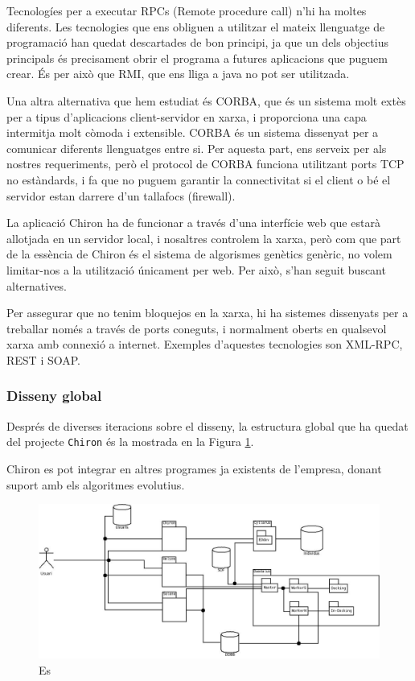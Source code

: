 Tecnologíes per a executar RPCs (Remote procedure call) n'hi ha moltes
diferents. Les tecnologies que ens obliguen a utilitzar el mateix llenguatge de
programació han quedat descartades de bon principi, ja que un dels objectius
principals és precisament obrir el programa a futures aplicacions que puguem
crear.  És per això que RMI, que ens lliga a java no pot ser utilitzada.  

Una altra alternativa que hem estudiat és CORBA, que és un sistema molt extès
per a tipus d'aplicacions client-servidor en xarxa, i proporciona una capa
intermitja molt còmoda i extensible.  CORBA és un sistema dissenyat per a
comunicar diferents llenguatges entre si.  Per aquesta part, ens serveix per als
nostres requeriments, però el protocol de CORBA funciona utilitzant ports TCP
no estàndards, i fa que no puguem garantir la connectivitat si el client o bé el
servidor estan darrere d'un tallafocs (firewall).

La aplicació Chiron ha de funcionar a través d'una interfície web que estarà
allotjada en un servidor local, i nosaltres controlem la xarxa, però com que
part de la essència de Chiron és el sistema de algorismes genètics genèric, no
volem limitar-nos a la utilització únicament per web.  Per això, s'han seguit
buscant alternatives.

Per assegurar que no tenim bloquejos en la xarxa, hi ha sistemes dissenyats per a
treballar només a través de ports coneguts, i normalment oberts en qualsevol
xarxa amb connexió a internet.  Exemples d'aquestes tecnologies son XML-RPC, REST
i SOAP.

\subsubsection{Disseny global} %
\label{ssub:Diseny global}

Després de diverses iteracions sobre el disseny, la estructura global que ha
quedat del projecte \texttt{Chiron} és la mostrada en la Figura \ref{fig:disenyChiron}.

Chiron es pot integrar en altres programes ja existents de l'empresa, donant
suport amb els algoritmes evolutius.  

\begin{figure}[h]
	\begin{center}
		\includegraphics[scale=0.4]{chiron/arquitectura_global_chiron.jpg}
	\end{center}
	\caption{Es}
	\label{fig:disenyChiron}
\end{figure}

